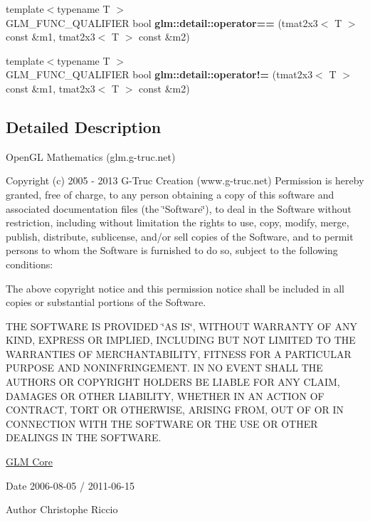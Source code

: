 \begin{DoxyCompactItemize}
\item 
\hypertarget{namespaceglm_1_1detail_ada047383848239b91e1adb9eda99b519}{}{\footnotesize template$<$typename T $>$ }\\G\+L\+M\+\_\+\+F\+U\+N\+C\+\_\+\+Q\+U\+A\+L\+I\+F\+I\+E\+R bool {\bfseries glm\+::detail\+::operator==} (tmat2x3$<$ T $>$ const \&m1, tmat2x3$<$ T $>$ const \&m2)\label{namespaceglm_1_1detail_ada047383848239b91e1adb9eda99b519}

\item 
\hypertarget{namespaceglm_1_1detail_a1d115764911dd070526a224c2f6a1311}{}{\footnotesize template$<$typename T $>$ }\\G\+L\+M\+\_\+\+F\+U\+N\+C\+\_\+\+Q\+U\+A\+L\+I\+F\+I\+E\+R bool {\bfseries glm\+::detail\+::operator!=} (tmat2x3$<$ T $>$ const \&m1, tmat2x3$<$ T $>$ const \&m2)\label{namespaceglm_1_1detail_a1d115764911dd070526a224c2f6a1311}

\end{DoxyCompactItemize}


\subsection{Detailed Description}
Open\+G\+L Mathematics (glm.\+g-\/truc.\+net)

Copyright (c) 2005 -\/ 2013 G-\/\+Truc Creation (www.\+g-\/truc.\+net) Permission is hereby granted, free of charge, to any person obtaining a copy of this software and associated documentation files (the \char`\"{}\+Software\char`\"{}), to deal in the Software without restriction, including without limitation the rights to use, copy, modify, merge, publish, distribute, sublicense, and/or sell copies of the Software, and to permit persons to whom the Software is furnished to do so, subject to the following conditions\+:

The above copyright notice and this permission notice shall be included in all copies or substantial portions of the Software.

T\+H\+E S\+O\+F\+T\+W\+A\+R\+E I\+S P\+R\+O\+V\+I\+D\+E\+D \char`\"{}\+A\+S I\+S\char`\"{}, W\+I\+T\+H\+O\+U\+T W\+A\+R\+R\+A\+N\+T\+Y O\+F A\+N\+Y K\+I\+N\+D, E\+X\+P\+R\+E\+S\+S O\+R I\+M\+P\+L\+I\+E\+D, I\+N\+C\+L\+U\+D\+I\+N\+G B\+U\+T N\+O\+T L\+I\+M\+I\+T\+E\+D T\+O T\+H\+E W\+A\+R\+R\+A\+N\+T\+I\+E\+S O\+F M\+E\+R\+C\+H\+A\+N\+T\+A\+B\+I\+L\+I\+T\+Y, F\+I\+T\+N\+E\+S\+S F\+O\+R A P\+A\+R\+T\+I\+C\+U\+L\+A\+R P\+U\+R\+P\+O\+S\+E A\+N\+D N\+O\+N\+I\+N\+F\+R\+I\+N\+G\+E\+M\+E\+N\+T. I\+N N\+O E\+V\+E\+N\+T S\+H\+A\+L\+L T\+H\+E A\+U\+T\+H\+O\+R\+S O\+R C\+O\+P\+Y\+R\+I\+G\+H\+T H\+O\+L\+D\+E\+R\+S B\+E L\+I\+A\+B\+L\+E F\+O\+R A\+N\+Y C\+L\+A\+I\+M, D\+A\+M\+A\+G\+E\+S O\+R O\+T\+H\+E\+R L\+I\+A\+B\+I\+L\+I\+T\+Y, W\+H\+E\+T\+H\+E\+R I\+N A\+N A\+C\+T\+I\+O\+N O\+F C\+O\+N\+T\+R\+A\+C\+T, T\+O\+R\+T O\+R O\+T\+H\+E\+R\+W\+I\+S\+E, A\+R\+I\+S\+I\+N\+G F\+R\+O\+M, O\+U\+T O\+F O\+R I\+N C\+O\+N\+N\+E\+C\+T\+I\+O\+N W\+I\+T\+H T\+H\+E S\+O\+F\+T\+W\+A\+R\+E O\+R T\+H\+E U\+S\+E O\+R O\+T\+H\+E\+R D\+E\+A\+L\+I\+N\+G\+S I\+N T\+H\+E S\+O\+F\+T\+W\+A\+R\+E.

\hyperlink{group__core}{G\+L\+M Core}

\begin{DoxyDate}{Date}
2006-\/08-\/05 / 2011-\/06-\/15 
\end{DoxyDate}
\begin{DoxyAuthor}{Author}
Christophe Riccio 
\end{DoxyAuthor}
